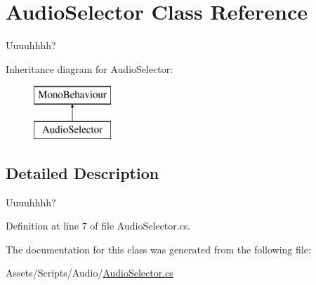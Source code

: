 \hypertarget{class_audio_selector}{}\section{Audio\+Selector Class Reference}
\label{class_audio_selector}


Uuuuhhhh?  


Inheritance diagram for Audio\+Selector\+:\begin{figure}[H]
\begin{center}
\leavevmode
\includegraphics[height=2.000000cm]{class_audio_selector}
\end{center}
\end{figure}


\subsection{Detailed Description}
Uuuuhhhh? 



Definition at line 7 of file Audio\+Selector.\+cs.



The documentation for this class was generated from the following file\+:\begin{DoxyCompactItemize}
\item 
Assets/\+Scripts/\+Audio/\mbox{\hyperlink{_audio_selector_8cs}{Audio\+Selector.\+cs}}\end{DoxyCompactItemize}
